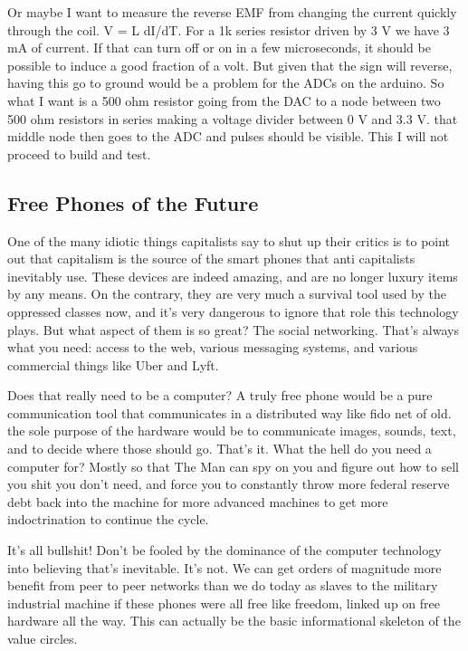 Or maybe I want to measure the reverse EMF from changing the current
quickly through the coil. V = L dI/dT. For a 1k series resistor driven
by 3 V we have 3 mA of current. If that can turn off or on in a few
microseconds, it should be possible to induce a good fraction of a volt.
But given that the sign will reverse, having this go to ground would be
a problem for the ADCs on the arduino. So what I want is a 500 ohm
resistor going from the DAC to a node between two 500 ohm resistors in
series making a voltage divider between 0 V and 3.3 V. that middle node
then goes to the ADC and pulses should be visible. This I will not
proceed to build and test.

\subsection{Free Phones of the Future}\label{free-phones-of-the-future}

One of the many idiotic things capitalists say to shut up their critics
is to point out that capitalism is the source of the smart phones that
anti capitalists inevitably use. These devices are indeed amazing, and
are no longer luxury items by any means. On the contrary, they are very
much a survival tool used by the oppressed classes now, and it's very
dangerous to ignore that role this technology plays. But what aspect of
them is so great? The social networking. That's always what you need:
access to the web, various messaging systems, and various commercial
things like Uber and Lyft.

Does that really need to be a computer? A truly free phone would be a
pure communication tool that communicates in a distributed way like fido
net of old. the sole purpose of the hardware would be to communicate
images, sounds, text, and to decide where those should go. That's it.
What the hell do you need a computer for? Mostly so that The Man can spy
on you and figure out how to sell you shit you don't need, and force you
to constantly throw more federal reserve debt back into the machine for
more advanced machines to get more indoctrination to continue the cycle.

It's all bullshit! Don't be fooled by the dominance of the computer
technology into believing that's inevitable. It's not. We can get orders
of magnitude more benefit from peer to peer networks than we do today as
slaves to the military industrial machine if these phones were all free
like freedom, linked up on free hardware all the way. This can actually
be the basic informational skeleton of the value circles.

